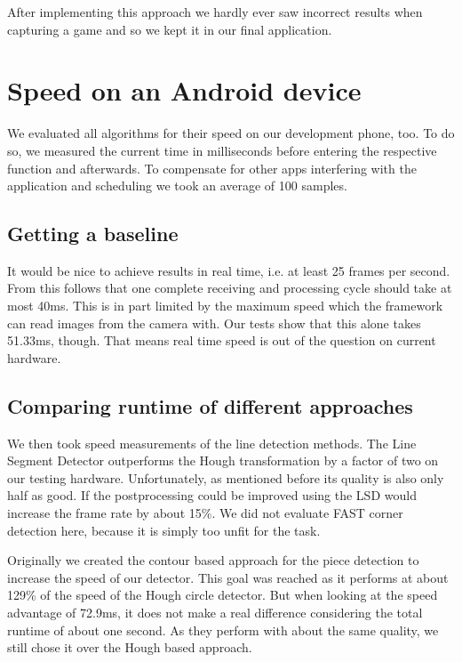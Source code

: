 	After implementing this approach we hardly ever saw incorrect results when capturing a game and so we kept it in our final application.






	\section{Speed on an Android device}
	\label{evaluation-speed}
	We evaluated all algorithms for their speed on our development phone, too. To do so, we measured the current time in milliseconds before entering the respective function and afterwards. To compensate for other apps interfering with the application and scheduling we took an average of 100 samples.

	\subsection{Getting a baseline}
	\label{evaluation-speed-baseline}
	It would be nice to achieve results in real time, i.e. at least 25 frames per second. From this follows that one complete receiving and processing cycle should take at most 40ms. This is in part limited by the maximum speed which the framework can read images from the camera with. Our tests show that this alone takes 51.33ms, though. That means real time speed is out of the question on current hardware.

	\subsection{Comparing runtime of different approaches}
	\label{evaluation-speed-approaches}
	We then took speed measurements of the line detection methods. The Line Segment Detector outperforms the Hough transformation by a factor of two on our testing hardware. Unfortunately, as mentioned before its quality is also only half as good. If the postprocessing could be improved using the LSD would increase the frame rate by about 15\%. We did not evaluate FAST corner detection here, because it is simply too unfit for the task.

	Originally we created the contour based approach for the piece detection to increase the speed of our detector. This goal was reached as it performs at about 129\% of the speed of the Hough circle detector. But when looking at the speed advantage of 72.9ms, it does not make a real difference considering the total runtime of about one second. As they perform with about the same quality, we still chose it over the Hough based approach.

